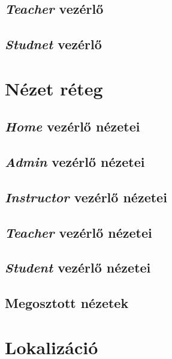 \subsection{\emph{Teacher} vezérlő}
\subsection{\emph{Studnet} vezérlő}
\section{Nézet réteg}
\label{sec:view}
\subsection{\emph{Home} vezérlő nézetei}
\subsection{\emph{Admin} vezérlő nézetei}
\subsection{\emph{Instructor} vezérlő nézetei}
\subsection{\emph{Teacher} vezérlő nézetei}
\subsection{\emph{Student} vezérlő nézetei}
\subsection{Megosztott nézetek}
\section{Lokalizáció}
\label{sec:localization}